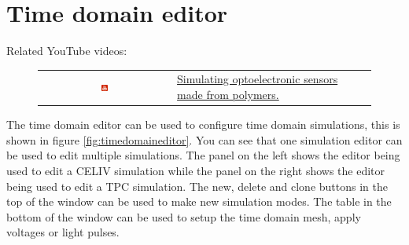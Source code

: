 \newpage
\section{Time domain editor}
Related YouTube videos:
\begin{figure}[H]

\begin{tabular}{ c l }

\includegraphics[width=0.05\textwidth]{./images/youtube.png}

&
\href{https://www.youtube.com/watch?v=D7yJLFmTAVQ}{Simulating optoelectronic sensors made from polymers.}

\end{tabular}
\end{figure}

The time domain editor can be used to configure time domain simulations, this is shown in figure \ref{fig:timedomaineditor}.  You can see that one simulation editor can be used to edit multiple simulations.  The panel on the left shows the editor being used to edit a CELIV simulation while the panel on the right shows the editor being used to edit a TPC simulation.  The new, delete and clone buttons in the top of the window can be used to make new simulation modes. The table in the bottom of the window can be used to setup the time domain mesh, apply voltages or light pulses.

